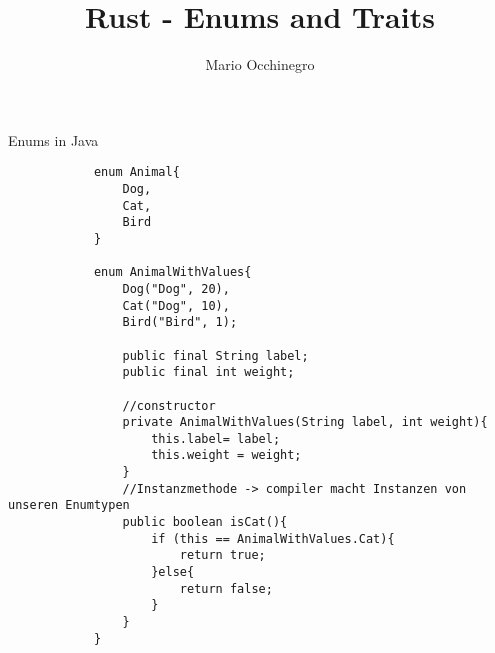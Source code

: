\documentclass{beamer}
\title{Rust - Enums and Traits}
\author{Mario Occhinegro}
\date{}
\begin{document}
	\maketitle
	\begin{frame}[fragile]{Enums in Java}
	
		\begin{lstlisting}
			enum Animal{
				Dog,
				Cat,
				Bird
			}
			
			enum AnimalWithValues{
				Dog("Dog", 20),
				Cat("Dog", 10),
				Bird("Bird", 1);
				
				public final String label;
				public final int weight;
				
				//constructor
				private AnimalWithValues(String label, int weight){
					this.label= label;
					this.weight = weight;
				}
				//Instanzmethode -> compiler macht Instanzen von unseren Enumtypen
				public boolean isCat(){
					if (this == AnimalWithValues.Cat){
						return true;
					}else{
						return false;
					}
				}
			}
		\end{lstlisting}
	\end{frame}
\end{document}
